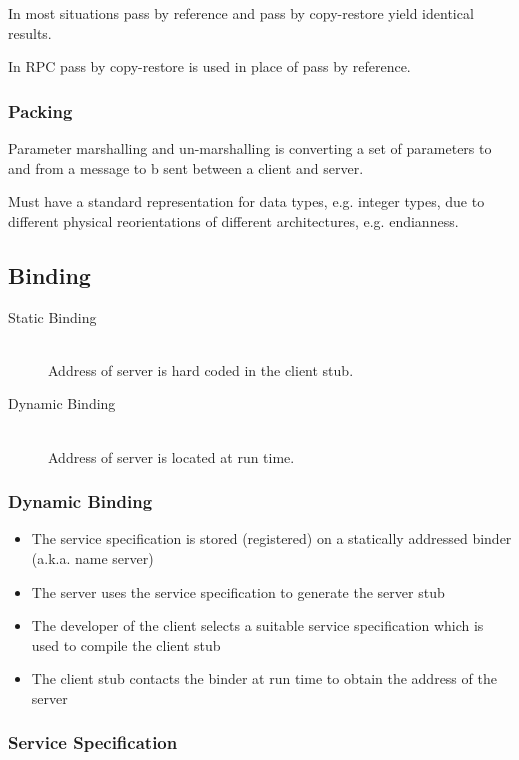 \documentclass[a4paper]{article}
\begin{document}
In most situations pass by reference and pass by copy-restore yield identical
results.

In RPC pass by copy-restore is used in place of pass by reference.

\subsubsection{Packing}

Parameter marshalling and un-marshalling is converting a set of parameters to
and from a message to b sent between a client and server.

Must have a standard representation for data types, e.g. integer types, due to
different physical reorientations of different architectures, e.g. endianness.

\subsection{Binding}

\begin{description}
  \item[Static Binding] \hfill \\
    Address of server is hard coded in the client stub.
  \item[Dynamic Binding] \hfill \\
    Address of server is located at run time.
\end{description}

\subsubsection{Dynamic Binding}

\begin{itemize}
  \item The service specification is stored (registered) on a statically
        addressed binder (a.k.a. name server)
  \item The server uses the service specification to generate the server stub
  \item The developer of the client selects a suitable service specification
        which is used to compile the client stub
  \item The client stub contacts the binder at run time to obtain the address of
        the server
\end{itemize}

\subsubsection{Service Specification}
\end{document}
